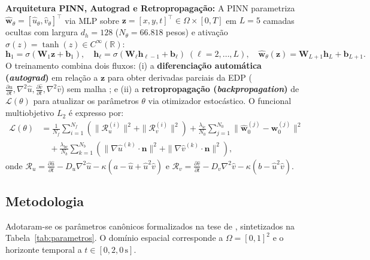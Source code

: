 \documentclass[a4paper, 12pt, twoside]{article}
\begin{document}
\textbf{Arquitetura PINN, Autograd e Retropropagação:} A PINN parametriza $\hat{\mathbf{w}}_\theta = [\hat{u}_\theta, \hat{v}_\theta]^\top$ via MLP sobre $\mathbf{z} = [x, y, t]^\top \in \Omega \times [0, T]$ em $L = 5$ camadas ocultas com largura $d_h = 128$ ($N_\theta = 66.818$ pesos) e ativação $\sigma(z) = \tanh(z) \in C^\infty(\mathbb{R})$:
\begin{equation}
  \mathbf{h}_1 = \sigma\left(\mathbf{W}_1 \mathbf{z} + \mathbf{b}_1\right), \quad \mathbf{h}_\ell = \sigma\left(\mathbf{W}_\ell \mathbf{h}_{\ell-1} + \mathbf{b}_\ell\right) \; (\ell=2,\dots,L), \quad \hat{\mathbf{w}}_\theta(\mathbf{z}) = \mathbf{W}_{L+1} \mathbf{h}_L + \mathbf{b}_{L+1}.
\end{equation}
O treinamento combina dois fluxos: (i) a \textbf{diferenciação automática (\textit{autograd})} em relação a $\mathbf{z}$ para obter derivadas parciais da EDP ($\frac{\partial \hat{u}}{\partial t}, \nabla^2 \hat{u}, \frac{\partial \hat{v}}{\partial t}, \nabla^2 \hat{v}$) sem malha \parencite{raissi2019pinns}; e (ii) a \textbf{retropropagação (\textit{backpropagation})} de $\mathcal{L}(\theta)$ para atualizar os parâmetros $\theta$ via otimizador estocástico. O funcional multiobjetivo $L_2$ é expresso por:
\begin{align}
  \mathcal{L}(\theta) &= \frac{1}{N_f}\sum_{i=1}^{N_f} \left(\|\mathcal{R}_u^{(i)}\|^2 + \|\mathcal{R}_v^{(i)}\|^2\right) + \frac{\lambda_{\mathrm{ic}}}{N_0}\sum_{j=1}^{N_0} \|\hat{\mathbf{w}}_0^{(j)} - \mathbf{w}_0^{(j)}\|^2 \nonumber \\
  &\quad + \frac{\lambda_{\mathrm{bc}}}{N_b}\sum_{k=1}^{N_b} \left(\|\nabla\hat{u}^{(k)}\cdot\mathbf{n}\|^2 + \|\nabla\hat{v}^{(k)}\cdot\mathbf{n}\|^2\right), \label{eq:loss_pinn}
\end{align}
onde $\mathcal{R}_u = \frac{\partial \hat{u}}{\partial t} - D_u \nabla^2 \hat{u} - \kappa(a - \hat{u} + \hat{u}^2 \hat{v})$ e $\mathcal{R}_v = \frac{\partial \hat{v}}{\partial t} - D_v \nabla^2 \hat{v} - \kappa(b - \hat{u}^2 \hat{v})$.

\subsection{Metodologia}

Adotaram-se os parâmetros canônicos formalizados na tese de \textcite[Cap.~2 e 4]{pereira2019}, sintetizados na Tabela~\ref{tab:parametros}. O domínio espacial corresponde a $\Omega = [0, 1]^2$ e o horizonte temporal a $t \in [0, 2{,}0\,\text{s}]$.
\end{document}
